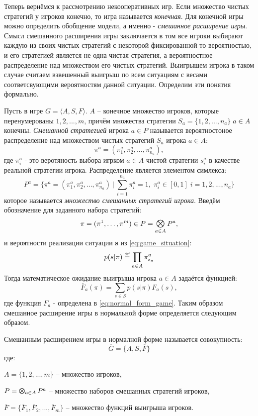 Теперь вернёмся к рассмотрению некооперативных игр.
Если множество чистых стратегий у игроков конечно, то игра
называется \textit{конечная}. Для конечной игры можно
определить обобщение модели, 
а именно - \textit{смешанное расширение игры}.
Смысл смешанного расширения игры заключается в том
все игроки выбирают каждую из своих чистых стратегий с некоторой
фиксированной то вероятностью, и его стратегией является
не одна чистая стратегия, а вероятностное  распределение над множеством 
его чистых стратегий. Выигрышем игрока в таком случае считаем взвешенный
выигрыш по всем ситуациям с весами соответсвующими вероятностям данной
ситуации. Определим эти понятия формально.

Пусть в игре 
$G = \big \langle A, S, F \big \rangle$. $A$ -- конечное множество игроков,
которые перенумерованы $1, 2, ..., m$, причём
множества стратегии $S_a=\{1, 2,...,n_a\} \; a \in A$ конечны.  
\textit{Смешанной стратегией} игрока $a \in P$ называется 
вероятностоное распределение над множеством чистых стратегий 
$S_a$ игрока $a \in A$:
$$
	\pi^a=(\pi^a_1, \pi^a_2, ..., \pi^a_{n_a}),
$$
где $\pi^a_i$ - это веротяность выбора игрком $a \in A$ чистой 
стратегии $s^a_i$ в качестве реальной стратегии игрока.
Распределение является элементом симлекса:
$$
	P^a = \{ 
		\pi^a=(\pi^a_1, \pi^a_2, ..., \pi^a_{n_a}) \: | \:
		\sum \limits_{i=1}^{n_a} \pi^a_i = 1, \; \pi^a_i \in [0,1] \; 
		i = 1, 2, ..., n_a
		\}
$$
которое называется \textit{множество смешанных стратегий игрока}.
Введём обозначение для заданного набора стратегий:
$$
	\pi = (\pi^1, \ldots, \pi^m) \in P = \Motimes_{a \in A} P^a,
$$
и вероятности реализации ситуации \textbf{s} из 
\eqref{eq:game_situation}:
$$
	p(s|\pi) \myeq \prod_{a \in A} \pi^a_{s_a}
$$
Тогда математическое ожидание выигрыша игрока $a \in A$
задаётся функцией: 
$$
	\overline F_a(\pi) = \sum \limits_{s \in S}p(s|\pi)F_a(s),
$$
где функция $F_a$ - определена в \eqref{eq:normal_form_game}.
Таким образом смешанное расширение игры в нормальной форме определяется
следующим образом. 

\begin{Def}
	Смешанным расширением игры в нормалной форме называется 
	совокупность:
	\begin{equation}
		\overline G = \lbrace A, S, \overline F \rbrace	
		\label{eq:ext_normal_form_game}
	\end{equation}
	где: 
 
	$A = \{1, 2, ..., m\}$ -- множество игроков,

	$P = \Motimes_{a \in A} P^a$ -- множество наборов смешанных 
	стратегий игроков,

	$\overline F = \{
		\overline F_1, \overline F_2, ..., \overline F_m
	\}$
	-- множество функций выигрыша игроков.
\end{Def}

